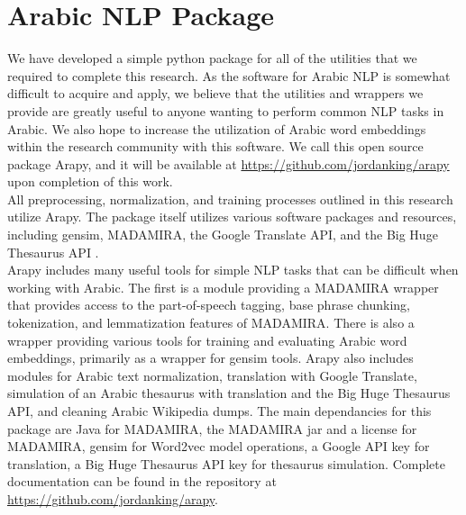 \chapter{Arabic NLP Package}
\label{sec:arapy}

We have developed a simple python package for all of the utilities that we required to complete this research. As the software for Arabic NLP is somewhat difficult to acquire and apply, we believe that the utilities and wrappers we provide are greatly useful to anyone wanting to perform common NLP tasks in Arabic. We also hope to increase the utilization of Arabic word embeddings within the research community with this software. We call this open source package Arapy, and it will be available at \url{https://github.com/jordanking/arapy} upon completion of this work. 
\\
All preprocessing, normalization, and training processes outlined in this research utilize Arapy. The package itself utilizes various software packages and resources, including gensim, MADAMIRA, the Google Translate API, and the Big Huge Thesaurus API \cite{rehurek_lrec,pasha:2014,google:online,bhl:online}.
\\
Arapy includes many useful tools for simple NLP tasks that can be difficult when working with Arabic. The first is a module providing a MADAMIRA wrapper that provides access to the part-of-speech tagging, base phrase chunking, tokenization, and lemmatization features of MADAMIRA. There is also a wrapper providing various tools for training and evaluating Arabic word embeddings, primarily as a wrapper for gensim tools. Arapy also includes modules for Arabic text normalization, translation with Google Translate, simulation of an Arabic thesaurus with translation and the Big Huge Thesaurus API, and cleaning Arabic Wikipedia dumps. The main dependancies for this package are Java for MADAMIRA, the MADAMIRA jar and a license for MADAMIRA, gensim for Word2vec model operations, a Google API key for translation, a Big Huge Thesaurus API key for thesaurus simulation. Complete documentation can be found in the repository at \url{https://github.com/jordanking/arapy}.
